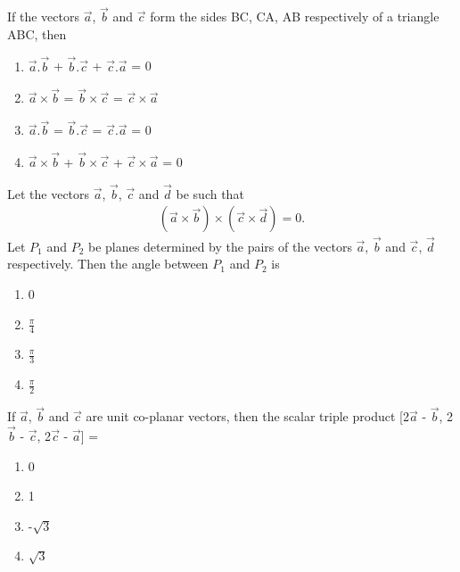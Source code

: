 \item If the vectors $\overrightarrow{a}$, $\overrightarrow{b}$ and $\overrightarrow{c}$ form the sides BC, CA, AB respectively of a triangle ABC, then
\begin{enumerate}
\item $\overrightarrow{a} . \overrightarrow{b}$ + $\overrightarrow{b} . \overrightarrow{c}$ + $\overrightarrow{c} . \overrightarrow{a}$ = 0
\item $\overrightarrow{a} \times \overrightarrow{b}$ = $\overrightarrow{b} \times \overrightarrow{c}$ = $\overrightarrow{c} \times \overrightarrow{a}$
\item $\overrightarrow{a} . \overrightarrow{b}$ = $\overrightarrow{b} . \overrightarrow{c}$ = $\overrightarrow{c} . \overrightarrow{a}$ = 0
\item $\overrightarrow{a} \times \overrightarrow{b}$ + $\overrightarrow{b} \times \overrightarrow{c}$ + $\overrightarrow{c} \times \overrightarrow{a}$ = 0
\end{enumerate}

\item Let the vectors $\overrightarrow{a}$, $\overrightarrow{b}$, $\overrightarrow{c}$ and 
$\overrightarrow{d}$ be such that 
\begin{align*}
(\overrightarrow{a} \times \overrightarrow{b}) \times (\overrightarrow{c} \times \overrightarrow{d}) = 0.
\end{align*}
Let $P_1$ and $P_2$ be planes determined by the pairs of the vectors $\overrightarrow{a}$, $\overrightarrow{b}$ and $\overrightarrow{c}$, $\overrightarrow{d}$ respectively. Then the angle between $P_1$ and $P_2$ is
\begin{enumerate}
\item 0
\item $\frac{\pi}{4}$
\item $\frac{\pi}{3}$
\item $\frac{\pi}{2}$
\end{enumerate}

\item If $\overrightarrow{a}$, $\overrightarrow{b}$ and $\overrightarrow{c}$ are unit co-planar vectors, then the scalar triple product [2$\overrightarrow{a}$ - $\overrightarrow{b}$, 2$\overrightarrow{b}$ - $\overrightarrow{c}$, 2$\overrightarrow{c}$ - $\overrightarrow{a}$] = 
\begin{enumerate}
\item 0
\item 1
\item -$\sqrt{3}$
\item $\sqrt{3}$
\end{enumerate}

